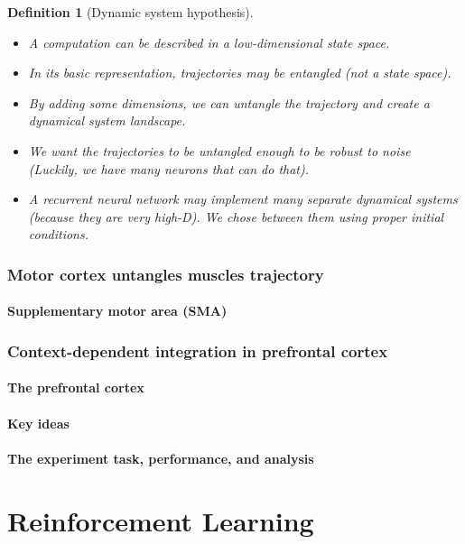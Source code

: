 \documentclass[11pt]{book} %
\newtheorem{definition}{Definition}[section]
\begin{document}
\begin{definition}[Dynamic system hypothesis]\ \\
    \begin{itemize}
        \item A computation can be described in a low-dimensional state space.
        \item In its basic representation, trajectories may be entangled (not a state space).
        \item By adding some dimensions, we can untangle the trajectory and create a dynamical system landscape.
        \item We want the trajectories to be untangled enough to be robust to noise (Luckily, we have many neurons that can do that).
        \item A recurrent neural network may implement many separate dynamical systems (because they are very high-D). We chose between them using proper initial conditions.
    \end{itemize}    
\end{definition}

\subsection{Motor cortex untangles muscles trajectory}
\subsubsection{Supplementary motor area (SMA)}
\subsection{Context-dependent integration in prefrontal cortex}
\subsubsection{The prefrontal cortex}
\subsubsection{Key ideas}
\subsubsection{The experiment task, performance, and analysis}

%
%
%
%
%
%
%
%
%
%
%
%
%
%
%
%


\chapter{Reinforcement Learning}
\end{document}
